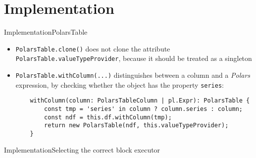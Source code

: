 \section{Implementation}
\begin{frame}[t,fragile]{Implementation}{PolarsTable} %
	\begin{itemize}
		\item \Verb|PolarsTable.clone()| does not clone the attribute \Verb|PolarsTable.valueTypeProvider|, because it should be treated as a singleton
		\item \Verb|PolarsTable.withColumn(...)| distinguishes between a column and a \emph{Polars} expression, by checking whether the object has the property \Verb|series|:
		      \begin{center}
			      \begin{verbatim}
	withColumn(column: PolarsTableColumn | pl.Expr): PolarsTable {
		const tmp = 'series' in column ? column.series : column;
		const ndf = this.df.withColumn(tmp);
		return new PolarsTable(ndf, this.valueTypeProvider);
	}
\end{verbatim}
		      \end{center}
	\end{itemize}
\end{frame}

\begin{frame}[t]{Implementation}{Selecting the correct block executor}
	\centering
	
	\pause
	\vfill
	
\end{frame}

